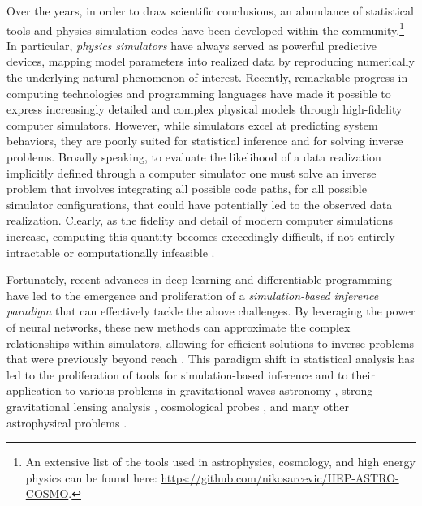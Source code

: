 Over the years, in order to draw scientific conclusions, an abundance of statistical tools and physics simulation codes have been developed within the community.\footnote{An extensive list of the tools used in astrophysics, cosmology, and high energy physics can be found here: \url{https://github.com/nikosarcevic/HEP-ASTRO-COSMO}.}
In particular, \emph{physics simulators} have always served as powerful predictive devices, mapping model parameters into realized data by reproducing numerically the underlying natural phenomenon of interest.
Recently, remarkable progress in computing technologies and programming languages have made it possible to express increasingly detailed and complex physical models through high-fidelity computer simulators. However, while simulators excel at predicting system behaviors, they are poorly suited for statistical inference and for solving inverse problems. 
Broadly speaking, to evaluate the likelihood of a data realization implicitly defined through a computer simulator one must solve an inverse problem that involves integrating all possible code paths, for all possible simulator configurations, that could have potentially led to the observed data realization. Clearly, as the fidelity and detail of modern computer simulations increase, computing this quantity becomes exceedingly difficult, if not entirely intractable or computationally infeasible  \cite{Cranmer:2019eaq}. 

Fortunately, recent advances in deep learning \cite{lecun2015deep} and differentiable programming \cite{baydin2018automatic} have led to the emergence and proliferation of a \emph{simulation-based inference paradigm} that can effectively tackle the above challenges. By leveraging the power of neural networks, these new methods can approximate the complex relationships within simulators, allowing for efficient solutions to inverse problems that were previously beyond reach \cite{Cranmer:2019eaq}. This paradigm shift in statistical analysis has led to the proliferation of tools for simulation-based inference \cite[\eg][]{Alsing:2019xrx, tejero-cantero2020sbi, Miller2022, lampe} and to their application to various problems in gravitational waves astronomy \cite[\eg][]{Dax:2021tsq, Crisostomi:2023tle, kolmus2024tuning, Dimitriou:2023knw, Vilchez:2024qnw, Bhardwaj:2023xph, Alvey:2023naa, Alvey:2023npw}, strong gravitational lensing analysis \cite[\eg][]{Montel:2022fhv, Wagner-Carena:2020yun, Wagner-Carena:2022mrn, wagnercarena2024strong, Coogan:2022cky, Brehmer:2019jyt, Zhang:2022djp}, cosmological probes \cite[\eg][]{List:2023aa, Tucci:2023bag, Alsing:2019xrx, Modi:2023drt, Makinen:2021nly, DES:2024xij, Jeffrey:2020aa, vonWietersheim-Kramsta:2024cks, Cole:2021gwr, FrancoAbellan:2024tbj, Saxena:2023tue, Karchev:2022xyn, Karchev:2024stw}, and many other astrophysical problems \cite[\eg][]{AnauMontel:2022ppb, Barret:2024kvc, vasist2023neural, Hahn:2022nda, khullar2022digs, Mishra-Sharma:2021oxe, Christy:2024hou, Hermans:2020skz, Alvey:2023pkx, Berteaud:2024zda, Mishra-Sharma:2021nhh}.

